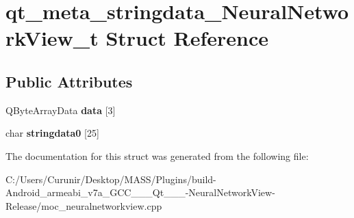 \hypertarget{structqt__meta__stringdata___neural_network_view__t}{}\section{qt\+\_\+meta\+\_\+stringdata\+\_\+\+Neural\+Network\+View\+\_\+t Struct Reference}
\label{structqt__meta__stringdata___neural_network_view__t}
\subsection*{Public Attributes}
\begin{DoxyCompactItemize}
\item 
\mbox{\label{structqt__meta__stringdata___neural_network_view__t_af5787a5f73eeb0d68d5a74d601cc392f}} 
Q\+Byte\+Array\+Data {\bfseries data} \mbox{[}3\mbox{]}
\item 
\mbox{\label{structqt__meta__stringdata___neural_network_view__t_ae8057f65823cb34cbb47d0fcdf444af5}} 
char {\bfseries stringdata0} \mbox{[}25\mbox{]}
\end{DoxyCompactItemize}


The documentation for this struct was generated from the following file\+:\begin{DoxyCompactItemize}
\item 
C\+:/\+Users/\+Curunir/\+Desktop/\+M\+A\+S\+S/\+Plugins/build-\/\+Android\+\_\+armeabi\+\_\+v7a\+\_\+\+G\+C\+C\+\_\+\_\+\_\+\+Qt\+\_\+\_\+\_-\/\+Neural\+Network\+View-\/\+Release/moc\+\_\+neuralnetworkview.\+cpp\end{DoxyCompactItemize}
